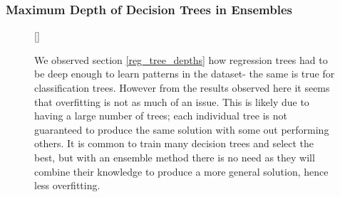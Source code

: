 \documentclass[11pt]{article}
\begin{document}
\subsubsection{Maximum Depth of Decision Trees in Ensembles}



\begin{figure}[h]
[\FBwidth]
{\caption{We observed section \ref{reg_tree_depths} how regression trees had to be deep enough to learn patterns in the dataset- the same is true for classification trees. However from the results observed here it seems that overfitting is not as much of an issue. This is likely due to having a large number of trees; each individual tree is not guaranteed to produce the same solution with some out performing others. It is common to train many decision trees and select the best, but with an ensemble method there is no need as they will combine their knowledge to produce a more general solution, hence less overfitting.}}
{}
\label{adaboost_depths}
\end{figure}
\end{document}
